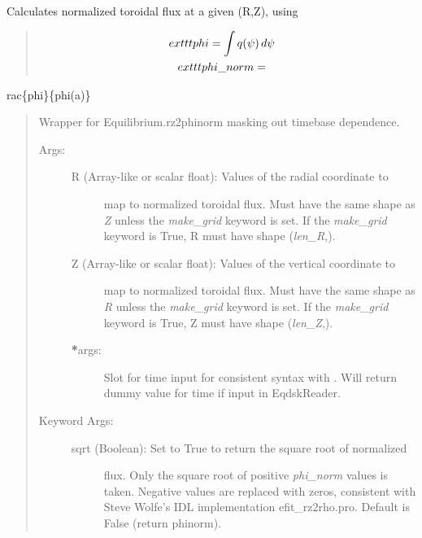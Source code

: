 \documentclass[letterpaper,10pt,english]{sphinxmanual}
\begin{document}
\begin{fulllineitems}
\begin{fulllineitems}
\label{eqtools:eqtools.eqdskreader.EqdskReader.rz2phinorm}
Calculates normalized toroidal flux at a given (R,Z), using
\begin{quote}
\begin{gather}
\begin{split}exttt{phi} &= \int q(\psi)\,d\psi\end{split}\notag\\\begin{split}exttt{phi\_norm} &=\end{split}\notag
\end{gather}\end{quote}

rac\{phi\}\{phi(a)\}
\begin{quote}

Wrapper for Equilibrium.rz2phinorm masking out timebase dependence.
\begin{description}
\item[{Args:}] \leavevmode\begin{description}
\item[{R (Array-like or scalar float): Values of the radial coordinate to}] \leavevmode
map to normalized toroidal flux. Must have the same shape as \emph{Z}
unless the \emph{make\_grid} keyword is set. If the \emph{make\_grid}
keyword is True, R must have shape (\emph{len\_R},).

\item[{Z (Array-like or scalar float): Values of the vertical coordinate to}] \leavevmode
map to normalized toroidal flux. Must have the same shape as \emph{R}
unless the \emph{make\_grid} keyword is set. If the \emph{make\_grid}
keyword is True, Z must have shape (\emph{len\_Z},).

\item[{{\color{red}\bfseries{}*}args:}] \leavevmode
Slot for time input for consistent syntax with
.  Will return dummy value for
time if input in EqdskReader.

\end{description}

\item[{Keyword Args:}] \leavevmode\begin{description}
\item[{sqrt (Boolean): Set to True to return the square root of normalized}] \leavevmode
flux. Only the square root of positive \emph{phi\_norm} values is
taken.  Negative values are replaced with zeros, consistent
with Steve Wolfe's IDL implementation efit\_rz2rho.pro. Default
is False (return phinorm).


\end{description}
\end{description}
\end{quote}
\end{fulllineitems}
\end{fulllineitems}
\end{document}
